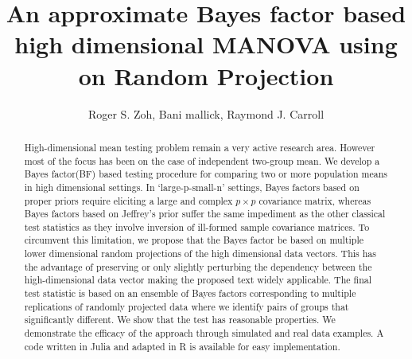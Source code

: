 \documentclass[]{article}
\title{An approximate Bayes factor based high dimensional MANOVA using on Random Projection}
\author{Roger S. Zoh, Bani mallick,  Raymond J. Carroll}
\begin{document}
	\maketitle

\begin{abstract}
	High-dimensional mean testing problem remain a very active research area. However most of the focus has been on the case of independent two-group mean. We develop a Bayes factor(BF) based testing procedure for comparing two or more population means in high dimensional settings. In ‘large-p-small-n’ settings, Bayes factors based on proper priors require eliciting a large and complex $p \times p$ covariance matrix, whereas Bayes factors based on Jeffrey’s prior suffer the same impediment as the other classical test statistics as they involve inversion of ill-formed sample covariance matrices. To circumvent this limitation, we propose that the Bayes factor be based on multiple lower dimensional random projections of the high dimensional data vectors. This has the advantage of preserving or only slightly perturbing the dependency between the high-dimensional data vector making the proposed text widely applicable. The final test statistic is based on an ensemble of Bayes factors corresponding to multiple replications of randomly projected data where we identify pairs of groups that significantly different. We show that the test has reasonable properties. We demonstrate the efficacy of the approach through simulated and real data examples. A code written in Julia and adapted in R is available for easy implementation. 
\end{abstract}
\end{document}
